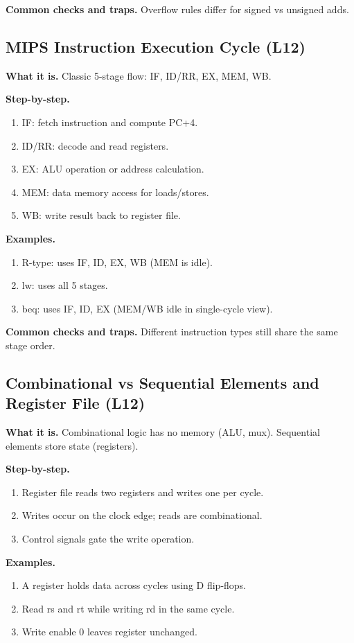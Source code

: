 \documentclass[11pt]{article}
\begin{document}
\textbf{Common checks and traps.} Overflow rules differ for signed vs unsigned adds.

\subsection{MIPS Instruction Execution Cycle (L12)}
\textbf{What it is.} Classic 5-stage flow: IF, ID/RR, EX, MEM, WB.

\textbf{Step-by-step.}
\begin{enumerate}[leftmargin=*]
  \item IF: fetch instruction and compute PC+4.
  \item ID/RR: decode and read registers.
  \item EX: ALU operation or address calculation.
  \item MEM: data memory access for loads/stores.
  \item WB: write result back to register file.
\end{enumerate}

\textbf{Examples.}
\begin{enumerate}[leftmargin=*]
  \item R-type: uses IF, ID, EX, WB (MEM is idle).
  \item lw: uses all 5 stages.
  \item beq: uses IF, ID, EX (MEM/WB idle in single-cycle view).
\end{enumerate}

\textbf{Common checks and traps.} Different instruction types still share the same stage order.

\subsection{Combinational vs Sequential Elements and Register File (L12)}
\textbf{What it is.} Combinational logic has no memory (ALU, mux). Sequential elements store state (registers).

\textbf{Step-by-step.}
\begin{enumerate}[leftmargin=*]
  \item Register file reads two registers and writes one per cycle.
  \item Writes occur on the clock edge; reads are combinational.
  \item Control signals gate the write operation.
\end{enumerate}

\textbf{Examples.}
\begin{enumerate}[leftmargin=*]
  \item A register holds data across cycles using D flip-flops.
  \item Read rs and rt while writing rd in the same cycle.
  \item Write enable 0 leaves register unchanged.
\end{enumerate}
\end{document}
